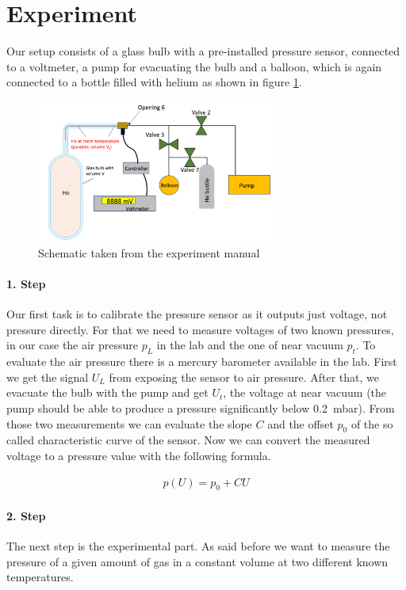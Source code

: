 \section{Experiment}
Our setup consists of a glass bulb with a pre-installed pressure sensor, connected to a voltmeter, a pump for evacuating the bulb and a balloon, which is again connected to a bottle filled with helium as shown in figure \ref{fig::shema}. 

\begin{figure}[h]
	\centering
	\includegraphics[width=0.7\textwidth]{sections/images/schematic.png}
	\caption{Schematic taken from the experiment manual\label{fig::shema}}
\end{figure}

\paragraph{1. Step}
Our first task is to calibrate the pressure sensor as it outputs just voltage, not pressure directly. For that we need to measure voltages of two known pressures, in our case the air pressure $p_L$ in the lab and the one of near vacuum $p_t$. To evaluate the air pressure there is a mercury barometer available in the lab. First we get the signal $U_L$ from exposing the sensor to air pressure. After that, we evacuate the bulb with the pump and get $U_t$, the voltage at near vacuum (the pump should be able to produce a pressure significantly below \SI{0.2}{\milli\bar}). From those two measurements we can evaluate the slope $C$ and the offset $p_0$ of the so called characteristic curve of the sensor. Now we can convert the measured voltage to a pressure value with the following formula.

\begin{align}
	p(U) = p_0 + CU
	\label{eq::convert}
\end{align}

\paragraph{2. Step}
\label{para:2}
The next step is the experimental part. As said before we want to measure the pressure of a given amount of gas in a constant volume at two different known temperatures. 

